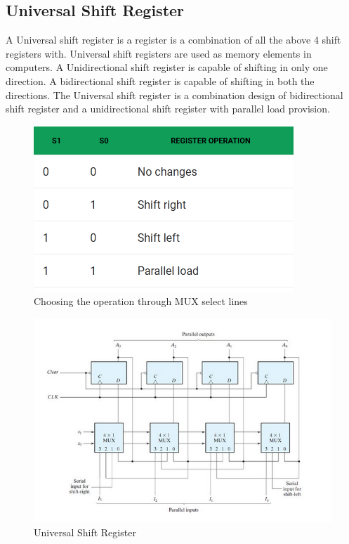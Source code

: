 \documentclass[12pt]{article}
\begin{document}
\subsection{Universal Shift Register}
A Universal shift register is a register is a combination of all the above 4 shift registers with. Universal shift registers are used as memory elements in computers. A Unidirectional shift register is capable of shifting in only one direction. A bidirectional shift register is capable of shifting in both the directions. The Universal shift register is a combination design of bidirectional shift register and a unidirectional shift register with parallel load provision.
\begin{figure}[H]
    \centering
    \includegraphics[]{circuit diagram/uni_operation.png}
    \caption{Choosing the operation through MUX select lines}
\end{figure}
\begin{figure}[H]
    \centering
    \includegraphics[scale=0.8]{circuit diagram/universal.png}
    \caption{Universal Shift Register}
    \label{fig:univ}
\end{figure}
\end{document}
